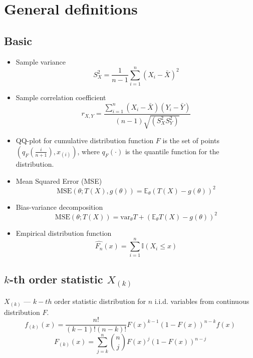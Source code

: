 \documentclass[12pt]{article}
\theoremstyle{definition}
\theoremstyle{remark}
\numberwithin{equation}{section}
\newcommand{\II}{\mathbb{I}}
\begin{document}
\section{General definitions}

\subsection{Basic}

\begin{itemize}
\item
Sample variance
\begin{equation}\label{sample_variance}
S_X^2 = \frac 1{n-1}\sum_{i = 1}^n(X_i - \bar X)^2
\end{equation}

\item
Sample correlation coefficient
\begin{equation}\label{sample_correlation}
r_{X,Y} = \frac{\sum_{i = 1}^{n}(X_i-\bar{X})(Y_i-\bar{Y})}{(n-1)\sqrt{(S_X^2S_Y^2)}}
\end{equation}

\item
QQ-plot for cumulative distribution function $F$ is the set of points $\left(q_F\left(\frac i {n+1}\right), x_{(i)}\right)$, where $q_F(\cdot)$ is the quantile function for the distribution.

\item Mean Squared Error (MSE)
\begin{equation}
	\text{MSE}(\theta; T(X), g(\theta)) = \mathbb{E}_\theta\left(T(X) - g(\theta)\right)^2
\end{equation}

\item
Bias-variance decomposition
\begin{equation}
\text{MSE}(\theta; T(X)) = \text{var}_\theta T + \left(\mathbb{E}_\theta T(X) - g(\theta)\right)^2
\end{equation}

\item\label{ecdf}
Empirical distribution function
\begin{equation}
	\hat{F_n}(x) = \sum_{i = 1}^n \II(X_i \leq x)
\end{equation}

\end{itemize}

\subsection {$k$-th order statistic $X_{(k)}$}
$X_{(k)}$ --- $k-th$ order statistic distribution for $n$ i.i.d. variables from continuous distribution $F$.
\begin{equation}\label{kth_order_pdf}
	f_{(k)}(x) = \frac{n!}{(k-1)!(n-k)!}F(x)^{k-1}(1-F(x))^{n-k}f(x)
\end{equation}
\begin{equation}\label{kth_order_cdf}
	F_{(k)}(x) = \sum_{j = k}^n {{n}\choose{j}}F(x)^j (1-F(x))^{n-j}
\end{equation}
\end{document}
